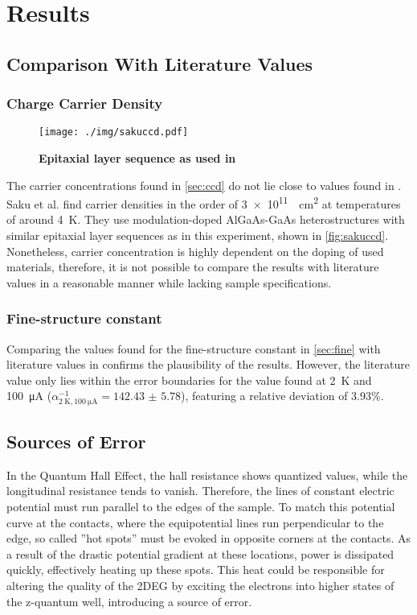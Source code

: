 \chapter{Results}

\section{Comparison With Literature Values} %
\subsection{Charge Carrier Density}
\begin{figure}
	\centering
	\texttt{[image: ./img/sakuccd.pdf]}
	\caption[Epitaxial layer sequence comparison]{\textbf{Epitaxial layer sequence as used in \cite{ccd}}}
	\label{fig:sakuccd}
\end{figure}
The carrier concentrations found in \autoref{sec:ccd} do not lie close to values found in \cite{ccd}.
Saku et al. find carrier densities in the order of \SI{3e11}{\per\centi\meter\squared} at temperatures of around \SI{4}{\kelvin}.
They use modulation-doped AlGaAs-GaAs heterostructures with similar epitaxial layer sequences as in this experiment, shown in \autoref{fig:sakuccd}.
Nonetheless, carrier concentration is highly dependent on the doping of used materials, therefore, it is not possible to compare the results with literature values in a reasonable manner while lacking sample specifications.

\subsection{Fine-structure constant}
Comparing the values found for the fine-structure constant in \autoref{sec:fine} with literature values in \cite{NIST} confirms the plausibility of the results.
However, the literature value only lies within the error boundaries for the value found at \SI{2}{\kelvin} and \SI{100}{\micro\ampere} ($\alpha^{-1}_{\SI{2}{\kelvin},\SI{100}{\micro\ampere}} = \num{142.43(578)}$), featuring a relative deviation of \num{3.93}\%.

\section{Sources of Error} %
In the Quantum Hall Effect, the hall resistance shows quantized values, while the longitudinal resistance tends to vanish.
Therefore, the lines of constant electric potential must run parallel to the edges of the sample.
To match this potential curve at the contacts, where the equipotential lines run perpendicular to the edge, so called ''hot spots'' must be evoked in opposite corners at the contacts.
As a result of the drastic potential gradient at these locations, power is dissipated quickly, effectively heating up these spots.
This heat could be responsible for altering the quality of the 2DEG by exciting the electrons into higher states of the z-quantum well, introducing a source of error. %
